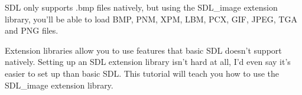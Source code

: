 
SDL only supports .bmp files natively, but using the SDL\_image extension
library, you'll be able to load BMP, PNM, XPM, LBM, PCX, GIF, JPEG, TGA and PNG
files.

Extension libraries allow you to use features that basic SDL doesn't support
natively. Setting up an SDL extension library isn't hard at all, I'd even say
it's easier to set up than basic SDL. This tutorial will teach you how to use
the SDL\_image extension library.

\secdown
\secrel{\win}

\secrel{\linux}
\secup
